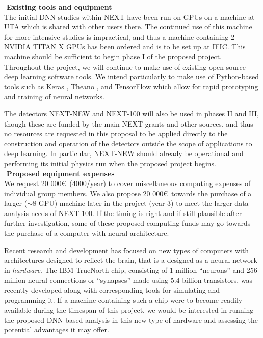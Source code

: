 \documentclass[11pt,a4paper]{article}
\begin{document}
\noindent\textbf{\textbullet\,\,Existing tools and equipment}\\
The initial DNN studies within NEXT have been run on GPUs on a machine at UTA which is shared with other users there. The continued use of this machine for more intensive studies is impractical, and thus a machine containing 2 NVIDIA TITAN X GPUs has been ordered and is to be set up at IFIC. This machine should be sufficient to begin phase I of the proposed project. Throughout the project, we will continue to make use of existing open-source deep learning software tools. We intend particularly to make use of Python-based tools such as Keras \cite{Keras}, Theano \cite{Theano}, and TensorFlow \cite{Tensorflow} which allow for rapid prototyping and training of neural networks.

The detectors NEXT-NEW and NEXT-100 will also be used in phases II and III, though these are funded by the main NEXT grants and other sources, and thus no resources are requested in this proposal to be applied directly to the construction and operation of the detectors outside the scope of applications to deep learning. In particular, NEXT-NEW should already be operational and performing its initial physics run when the proposed project begins.\\

\noindent\textbf{\textbullet\,\,Proposed equipment expenses}\\
We request 20 000\euro ~(4000/year) to cover miscellaneous computing expenses of individual group members. We also propose 20 000\euro ~towards the purchase of a larger ($\sim$8-GPU) machine later in the project (year 3) to meet the larger data analysis needs of NEXT-100. If the timing is right and if still plausible after further investigation, some of these proposed computing funds may go towards the purchase of a computer with neural architecture.

Recent research and development has focused on new types of computers with architectures designed to reflect the brain, that is a designed as a neural network in \emph{hardware}. The IBM TrueNorth \cite{TrueNorth} chip, consisting of 1 million ``neurons'' and 256 million neural connections or ``synapses'' made using 5.4 billion transistors, was recently developed along with corresponding tools for simulating and programming it. If a machine containing such a chip were to become readily available during the timespan of this project, we would be interested in running the proposed DNN-based analysis in this new type of hardware and assessing the potential advantages it may offer.\\
\end{document}
